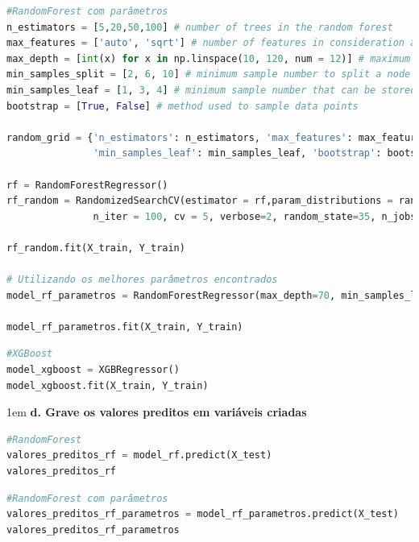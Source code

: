 \begin{lstlisting}[language=Python, style=input]
#RandomForest com parâmetros
n_estimators = [5,20,50,100] # number of trees in the random forest
max_features = ['auto', 'sqrt'] # number of features in consideration at every split
max_depth = [int(x) for x in np.linspace(10, 120, num = 12)] # maximum number of levels allowed in each decision tree
min_samples_split = [2, 6, 10] # minimum sample number to split a node
min_samples_leaf = [1, 3, 4] # minimum sample number that can be stored in a leaf node
bootstrap = [True, False] # method used to sample data points

random_grid = {'n_estimators': n_estimators, 'max_features': max_features, 'max_depth': max_depth, 'min_samples_split': min_samples_split, 
               'min_samples_leaf': min_samples_leaf, 'bootstrap': bootstrap}

rf = RandomForestRegressor()
rf_random = RandomizedSearchCV(estimator = rf,param_distributions = random_grid,
               n_iter = 100, cv = 5, verbose=2, random_state=35, n_jobs = -1)

rf_random.fit(X_train, Y_train)

# Utilizando os melhores parâmetros encontrados
model_rf_parametros = RandomForestRegressor(max_depth=70, min_samples_leaf=1, min_samples_split=2, n_estimators=20, random_state=80)

model_rf_parametros.fit(X_train, Y_train)
\end{lstlisting}

\begin{lstlisting}[language=Python, style=input]
#XGBoost
model_xgboost = XGBRegressor()
model_xgboost.fit(X_train, Y_train)
\end{lstlisting}


\begin{adjustwidth}{1em}{}
\textbf{d. Grave os valores preditos em variáveis criadas}
\end{adjustwidth}
\begin{lstlisting}[language=Python, style=input]
#RandomForest
valores_preditos_rf = model_rf.predict(X_test)
valores_preditos_rf 
\end{lstlisting}

\begin{lstlisting}[language=Python, style=input]
#RandomForest com parâmetros
valores_preditos_rf_parametros = model_rf_parametros.predict(X_test)
valores_preditos_rf_parametros
\end{lstlisting}

